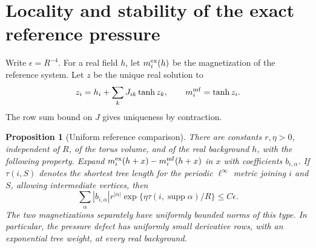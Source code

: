 \documentclass[11pt]{article}
\newtheorem{proposition}{Proposition}[section]
\begin{document}
\section{Locality and stability of the exact reference pressure}

Write \(\epsilon=R^{-4}\). For a real field \(h\), let \(m_i^{\rm ex}(h)\)
be the magnetization of the reference system. Let \(z\) be the unique real
solution to
\begin{equation}\label{eq:MF}
 z_i=h_i+\sum_k J_{ik}\tanh z_k,\qquad m_i^{\rm mf}=\tanh z_i .
\end{equation}
The row sum bound on \(J\) gives uniqueness by contraction.

\begin{proposition}[Uniform reference comparison]\label{prop:cavity}
There are constants \(r,\eta>0\), independent of \(R\), of the torus
volume, and of the real background \(h\), with the following property.
Expand \(m_i^{\rm ex}(h+x)-m_i^{\rm mf}(h+x)\) in \(x\) with coefficients
\(b_{i,\alpha}\). If \(\tau(i,S)\) denotes the shortest tree length for the periodic \(\ell^\infty\)
metric joining \(i\) and \(S\), allowing intermediate vertices,
then
\begin{equation}\label{eq:weighted}
 \sum_{\alpha}|b_{i,\alpha}|r^{|\alpha|}
       \exp\{\eta\tau(i,\operatorname{supp}\alpha)/R\}
 \le C\epsilon.
\end{equation}
The two magnetizations separately have uniformly bounded norms of this
type. In particular, the pressure defect has uniformly small derivative
rows, with an exponential tree weight, at every real background.
\end{proposition}
\end{document}
